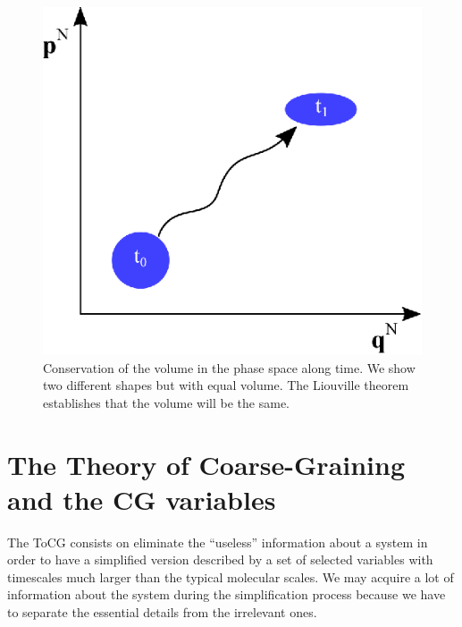 \documentclass[b5paper,openright,10pt]{book}
\begin{document}
\begin{figure}
    \centering
    \includegraphics[scale=0.9]{Liouville}
    \caption[Representation of the Liouville theorem]{Conservation of the volume in the phase space along time. We show two different shapes but with equal volume. The Liouville theorem establishes that the volume will be the same.}
    \label{fig:LiouvilleTh}
\end{figure}


%
%
\section{The Theory of Coarse-Graining and the CG variables}
The ToCG consists on eliminate the ``useless'' information about a system in order to have a simplified version described by a set of selected variables with timescales much larger than the typical molecular scales. 
We may acquire a lot of information about the system during the simplification process because we have to separate the essential details from the irrelevant ones. 
\end{document}

